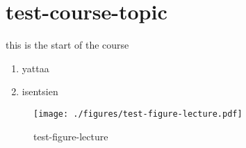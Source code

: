 \documentclass{article}
\begin{document}

\section{test-course-topic}




this is the start of the course 


\begin{enumerate}
  \item yattaa
    
    \item isentsien 
\end{enumerate}






\begin{figure}[ht]
    \centering
 \texttt{[image: ./figures/test-figure-lecture.pdf]}
    \caption{test-figure-lecture}
    \label{fig:test-figure-lecture}
\end{figure}
\end{document}
